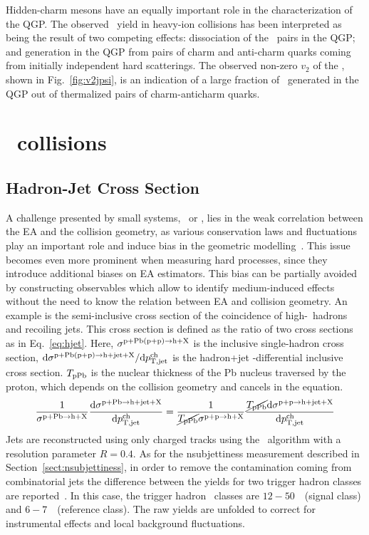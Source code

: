 \documentclass[10pt]{article}
\begin{document}
Hidden-charm mesons have an equally important role in the characterization of the QGP.
The observed \jpsi\ yield in heavy-ion collisions has been interpreted as being the result of two competing effects: dissociation of the \ccbar\ pairs in the QGP; and generation in the QGP from pairs of charm and anti-charm quarks coming from initially independent hard scatterings.
The observed non-zero $v_2$ of the \jpsi, shown in Fig.~\ref{fig:v2jpsi}, is an indication of a large fraction of \jpsi\ generated in the QGP out of thermalized pairs of charm-anticharm quarks.

\section{\pPb\ collisions}

\subsection{Hadron-Jet Cross Section} 
A challenge presented by small systems, \pp\ or \pPb, lies in the weak correlation between the EA and the collision geometry,
as various conservation laws and fluctuations play an important role and induce bias in the geometric modelling~\cite{ALICE:2014e}. 
This issue becomes even more prominent when measuring hard processes, since they introduce additional biases on EA estimators.
This bias can be partially avoided by constructing observables which allow to identify medium-induced effects without the need to know the relation between EA and collision geometry. 
An example is the semi-inclusive cross section of the coincidence of high-\pt\ hadrons and recoiling jets.
This cross section is defined as the ratio of two cross sections as in Eq.~\ref{eq:hjet}. Here, $\sigma^{{\rm p+Pb (p+p)}\rightarrow{\rm h+X}}$ is the inclusive single-hadron cross
section, $\mathrm{d}\sigma^{{\rm p+Pb (p+p)}\rightarrow{\rm h+jet+X}}/ \mathrm{d}p_{\rm T,jet}^{\rm ch}$ is the hadron+jet \pt-differential inclusive cross section.
$T_{\rm pPb}$ is the nuclear thickness of the Pb nucleus traversed by the proton, which depends on the collision geometry and cancels in the equation.
\begin{equation}
\frac{1}{\sigma^{{\rm p+Pb}\rightarrow{\rm h+X}}} \frac{\mathrm{d}\sigma^{{\rm p+Pb}\rightarrow{\rm h+jet+X}}}{\mathrm{d}p_{\rm T,jet}^{\rm ch}} = 
\frac{1}{\cancel{T_{\rm pPb}}\sigma^{{\rm p+p}\rightarrow{\rm h+X}}} \frac{\cancel{T_{\rm pPb}}\mathrm{d}\sigma^{{\rm p+p}\rightarrow{\rm h+jet+X}}}{\mathrm{d}p_{\rm T,jet}^{\rm ch}}
\label{eq:hjet}
\end{equation}
Jets are reconstructed using only charged tracks using the \antikt\ algorithm with a resolution parameter $R=0.4$.
As for the nsubjettiness measurement described in Section~\ref{sect:nsubjettiness}, in order to remove the contamination coming from combinatorial jets the difference between the yields
for two trigger hadron classes are reported~\cite{ALICE:2015g}. In this case, the trigger hadron \pt\ classes are $12-50$~\GeVc\ (signal class) and $6-7$~\GeVc\ (reference class).
The raw yields are unfolded to correct for instrumental effects and local background fluctuations.
\end{document}
